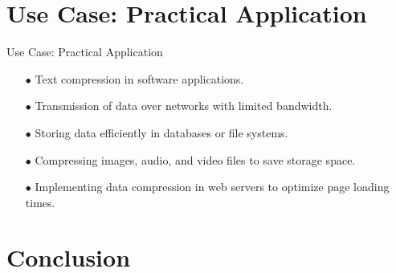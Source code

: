 \documentclass{beamer}
\begin{document}
\section{Use Case: Practical Application}
\begin{frame}{Use Case: Practical Application}
    \begin{itemize}
        \item[$\bullet$] Text compression in software applications.
        \item[$\bullet$] Transmission of data over networks with limited bandwidth.
        \item[$\bullet$] Storing data efficiently in databases or file systems.
        \item[$\bullet$] Compressing images, audio, and video files to save storage space.
        \item[$\bullet$] Implementing data compression in web servers to optimize page loading times.
    \end{itemize}
\end{frame}
\section{Conclusion}




\backmatter
\end{document}
